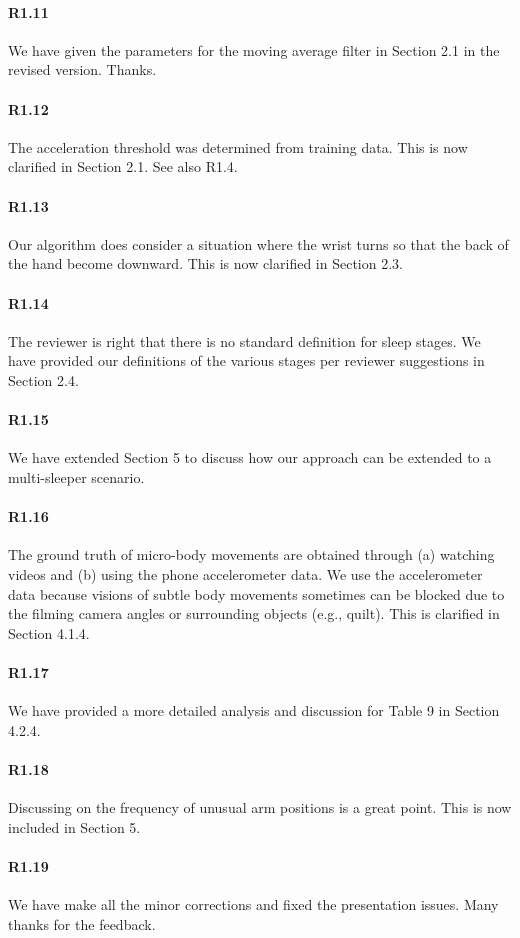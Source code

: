 \paragraph{R1.11} We have given the parameters for the moving average filter in Section 2.1 in the revised version. Thanks.
\vspace{-2mm}
\paragraph{R1.12} The acceleration threshold was determined from training data. This is now clarified in Section 2.1. See also
R1.4. \vspace{-2mm}
\paragraph{R1.13} Our algorithm does consider a situation where the wrist turns so that the back of the hand become downward. This is now clarified in Section 2.3.
\vspace{-2mm}
\paragraph{R1.14} The reviewer is right that there is no standard definition for sleep stages. We have provided our definitions of the various stages per reviewer suggestions in Section 2.4.

\paragraph{R1.15} We have extended Section 5 to discuss how our approach can be extended to a multi-sleeper scenario.
\vspace{-2mm}
\paragraph{R1.16} The ground truth of micro-body movements are obtained through (a) watching videos and (b) using the phone accelerometer data. We use the accelerometer data because visions of subtle body movements sometimes can be blocked due to the filming camera angles or surrounding objects (e.g., quilt). This is clarified in Section 4.1.4.

\paragraph{R1.17} We have provided a more detailed analysis and discussion for Table 9 in Section 4.2.4.
\vspace{-2mm}
\paragraph{R1.18} Discussing on the frequency of unusual arm positions is a great point. This is now included in Section 5.
\vspace{-2mm}
\paragraph{R1.19} We have make all the minor corrections and fixed the presentation issues. Many thanks for the feedback.
